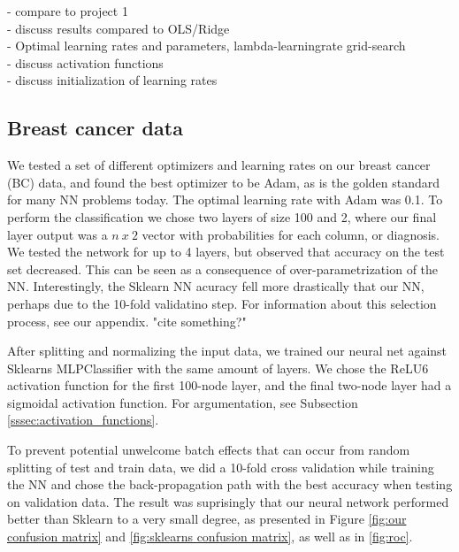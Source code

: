 - compare to project 1\\
- discuss results compared to OLS/Ridge\\
- Optimal learning rates and parameters, lambda-learningrate grid-search\\
- discuss activation functions\\
- discuss initialization of learning rates\\


\subsection{Breast cancer data}
We tested a set of different optimizers and learning rates on our breast cancer (BC) data, and found the best optimizer to be Adam, as is the golden standard for many NN problems today. The optimal learning rate with Adam was 0.1. To perform the classification we chose two layers of size 100 and 2, where our final layer output was a $n\ x\ 2$ vector with probabilities for each column, or diagnosis. We tested the network for up to 4 layers, but observed that accuracy on the test set decreased. This can be seen as a consequence of over-parametrization of the NN. Interestingly, the Sklearn NN acuracy fell more drastically that our NN, perhaps due to the 10-fold validatino step. For information about this selection process, see our appendix. "cite something?"

After splitting and normalizing the input data, we trained our neural net against Sklearns MLPClassifier with the same amount of layers. We chose the ReLU6 activation function for the first 100-node layer, and the final two-node layer had a sigmoidal activation function. For argumentation, see Subsection \ref{sssec:activation_functions}.

To prevent potential unwelcome batch effects that can occur from random splitting of test and train data, we did a 10-fold cross validation while training the NN and chose the back-propagation path with the best accuracy when testing on validation data. The result was suprisingly that our neural network performed better than Sklearn to a very small degree, as presented in Figure \ref{fig:our confusion matrix} and \ref{fig:sklearns confusion matrix}, as well as in \ref{fig:roc}.


